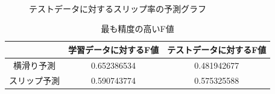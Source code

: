 \documentclass[twocolumn]{jsarticle}
\begin{document}
\begin{figure}[tbp]
	\centering
	\\
	\\
	\\
	\caption{テストデータに対するスリップ率の予測グラフ}
	\label{fig23}
\end{figure}
\begin{table}[tbp]
   \caption{最も精度の高いF値}
   \label{table01}
   \begin{center}
   \begin{tabular}{|c||c|c|}\hline
                    & 学習データに対するF値 & テストデータに対するF値 \\ \hline
     横滑り予測 & 0.652386534 & 0.481942677 \\ \hline
     スリップ予測 & 0.590743774 & 0.575325588 \\ \hline
   \end{tabular}
   \end{center}
\end{table}
\twocolumn
\end{document}
